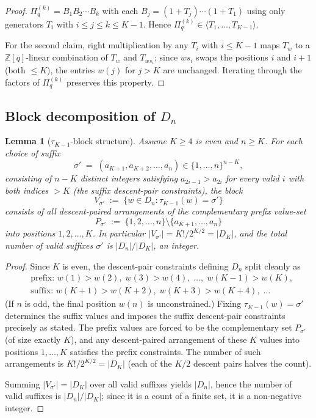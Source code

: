 \documentclass[11pt]{article}
\newtheorem{lemma}[theorem]{Lemma}
\theoremstyle{definition}
\begin{document}
\begin{proof}
$\Pi^{(k)}_q = B_1 B_2 \cdots B_k$ with each $B_j = (1+T_j)\cdots(1+T_1)$ using only generators $T_i$ with $i \leq j \leq k \leq K-1$.  Hence $\Pi^{(k)}_q \in \langle T_1,\ldots,T_{K-1}\rangle$.

For the second claim, right multiplication by any $T_i$ with $i \leq K-1$ maps $T_w$ to a $\mathbb{Z}[q]$-linear combination of $T_w$ and $T_{ws_i}$; since $ws_i$ swaps the positions $i$ and $i+1$ (both $\leq K$), the entries $w(j)$ for $j > K$ are unchanged.  Iterating through the factors of $\Pi^{(k)}_q$ preserves this property.
\end{proof}

\subsection{Block decomposition of $D_n$}

\begin{lemma}[$\tau_{K-1}$-block structure]\label{lem:blocks}
Assume $K \geq 4$ is even and $n \geq K$.  For each choice of suffix
\[
\sigma' \;=\; (a_{K+1}, a_{K+2}, \ldots, a_n) \in \{1,\ldots,n\}^{n-K},
\]
consisting of $n - K$ distinct integers satisfying $a_{2i-1} > a_{2i}$ for every valid $i$ with both indices $> K$ (the suffix descent-pair constraints), the block
\[
V_{\sigma'} \;:=\; \{ w \in D_n : \tau_{K-1}(w) = \sigma' \}
\]
consists of all descent-paired arrangements of the complementary prefix value-set
\[
P_{\sigma'} \;:=\; \{1,2,\ldots,n\} \setminus \{a_{K+1}, \ldots, a_n\}
\]
into positions $1, 2, \ldots, K$.  In particular $|V_{\sigma'}| = K! / 2^{K/2} = |D_K|$, and the total number of valid suffixes $\sigma'$ is $|D_n|/|D_K|$, an integer.
\end{lemma}

\begin{proof}
Since $K$ is even, the descent-pair constraints defining $D_n$ split cleanly as
\begin{align*}
&\text{prefix: } w(1) > w(2),\; w(3) > w(4),\; \ldots,\; w(K-1) > w(K), \\
&\text{suffix: } w(K+1) > w(K+2),\; w(K+3) > w(K+4),\; \ldots
\end{align*}
(If $n$ is odd, the final position $w(n)$ is unconstrained.)  Fixing $\tau_{K-1}(w) = \sigma'$ determines the suffix values and imposes the suffix descent-pair constraints precisely as stated.  The prefix values are forced to be the complementary set $P_{\sigma'}$ (of size exactly $K$), and any descent-paired arrangement of these $K$ values into positions $1,\ldots,K$ satisfies the prefix constraints.  The number of such arrangements is $K!/2^{K/2} = |D_K|$ (each of the $K/2$ descent pairs halves the count).

Summing $|V_{\sigma'}| = |D_K|$ over all valid suffixes yields $|D_n|$, hence the number of valid suffixes is $|D_n|/|D_K|$; since it is a count of a finite set, it is a non-negative integer.
\end{proof}
\end{document}
